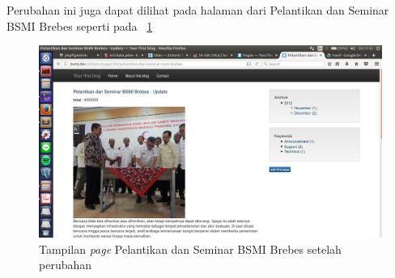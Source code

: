 Perubahan ini juga dapat dilihat pada halaman dari Pelantikan dan Seminar BSMI Brebes seperti pada \pic~\ref{fig:viewprogram5}
\begin{figure}
	\centering
	\includegraphics[width=1\textwidth]
	{pics/29-viewprogramupdatedonation.png}
	\caption{Tampilan \textit{page} Pelantikan dan Seminar BSMI Brebes setelah perubahan}
	\label{fig:viewprogram5}
\end{figure}
\vspace{-0.3cm}